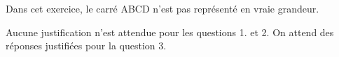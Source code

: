 \documentclass[10pt]{article}
\begin{document}
\setlength\parindent{0mm}
\pagestyle{fancy}
\thispagestyle{empty}
    
    
    




\medskip

Dans cet exercice, le carré ABCD n'est pas représenté en vraie grandeur.

Aucune justification n'est attendue pour les questions 1. et 2. On attend des réponses justifiées pour la question 3.

\medskip
\end{document}
